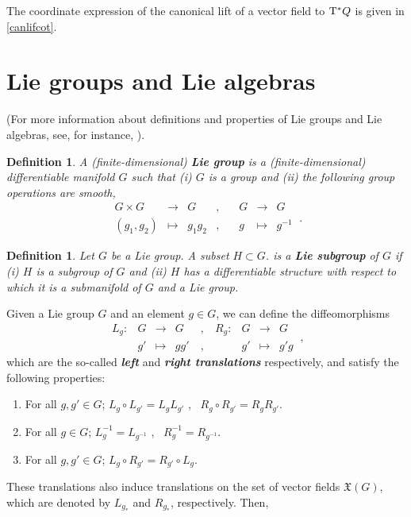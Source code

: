 \documentclass[12pt]{report}
\newtheorem{definition}[teor]{Definition}
\def\vf{\mathfrak X}
\def\Tan{{\rm T}}
\begin{document}
\begin{appendix}
The coordinate expression of the canonical lift of a vector field to $\Tan^*Q$ is given in \eqref{canlifcot}.



\section{Lie groups and Lie algebras}
\label{Liega}


(For more information about definitions and properties of Lie groups and Lie algebras, see,
for instance, \cite{Ar-89,CP-adg,Ok-87,To-65,Wa-fsmlg}).

\begin{definition}
A (finite-dimensional) \textbf{Lie group}
is a (finite-dimensional) differentiable manifold $G$ such that
{\rm (i)}
$G$ is a group and
{\rm (ii)}
the following group operations are smooth,
$$
\begin{array}{ccccccc}
G \times G &\to& G & ,\quad & G &\to& G
\\
(g_1,g_2) &\mapsto& g_1g_2 & ,\quad & g &\mapsto& g^{-1}
\end{array} \ .
$$
\end{definition}

\begin{definition}
Let $G$ be a Lie group. A subset $H \subset G$.
is a \textbf{Lie subgroup} of $G$ if
{\rm (i)} $H$ is a subgroup of $G$ and
{\rm (ii)} $H$ has a differentiable structure with respect
to which it is a submanifold of $G$ and a Lie group.
\end{definition}

Given a Lie group $G$ and an element $g \in G$,
we can define the diffeomorphisms
$$
\begin{array}{ccccccccc}
L_g \colon & G & \to & G & \ , \ & R_g \colon & G & \to & G
\\
& g' & \mapsto & gg' & \ , \ & &  g' & \mapsto & g'g
\end{array} \ ,
$$
which are the so-called {\sl \textbf{left}} and {\sl \textbf{right translations}}
respectively, and satisfy the following properties:
\begin{enumerate}
\item
For all $g,g' \in G$;\quad
$L_g \circ L_{g'} = L_gL_{g'}$ , \ 
$R_g \circ R_{g'} = R_gR_{g'}$.
\item
For all $g \in G$;\quad
$L_g^{-1} = L_{g^{-1}}$ , \
$R_g^{-1} = R_{g^{-1}}$.
\item
For all $g,g' \in G$;
$L_g \circ R_{g'} = R_{g'} \circ L_g$.
\end{enumerate}
These translations also induce translations on the set of
vector fields $\vf(G)$, which are denoted by
$L_{g_*}$ and $R_{g_*}$, respectively. Then, 


\end{appendix}
\end{document}
